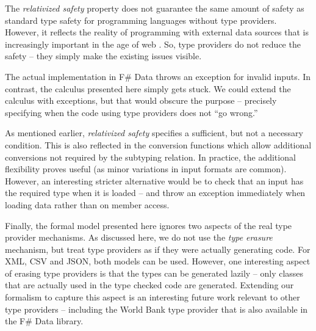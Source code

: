 \documentclass[preprint]{sigplanconf}
\begin{document}
The \emph{relativized safety} property does not guarantee the same amount of safety as standard type safety
for programming languages without type providers. However, it reflects the reality of programming with external
data sources that is increasingly important in the age of web \cite{age-of-web}. So, type providers do not
reduce the safety -- they simply make the existing issues visible.

The actual implementation in F\# Data throws an exception for invalid inputs. In contrast, the calculus
presented here simply gets stuck. We could extend the calculus with exceptions, but that would obscure the 
purpose -- precisely specifying when the code using type providers does not ``go wrong.''

As mentioned earlier, \emph{relativized safety} specifies a sufficient, but not a necessary condition.
This is also reflected in the conversion functions which allow additional conversions not required by 
the subtyping relation. In practice, the additional flexibility proves useful (as minor variations in 
input formats are common). However, an interesting stricter alternative would be to check that an input 
has the required type when it is loaded -- and throw an exception immediately when loading data rather than 
on member access.

Finally, the formal model presented here ignores two aspects of the real type provider mechanisms. As discussed
here, we do not use the \emph{type erasure} mechanism, but treat type providers as if they were actually 
generating code. For XML, CSV and JSON, both models can be used. However, one interesting aspect of erasing 
type providers is that the types can be generated lazily -- only classes that are actually used in the type
checked code are generated. Extending our formalism to capture this aspect is an interesting future work
relevant to other type providers -- including the World Bank type provider that is also available
in the F\# Data library.



%
%
\end{document}
